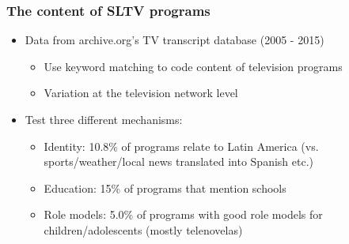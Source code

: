\documentclass{beamer}
\begin{document}
\begin{frame}
\frametitle{The content of SLTV programs}
\begin{itemize}
\item Data from archive.org's TV transcript database (2005 - 2015)
\begin{itemize}
\item Use keyword matching to code content of television programs
\item Variation at the television network level
\end{itemize}
\item Test three different mechanisms:
\begin{itemize}
\item Identity: 10.8\% of programs relate to Latin America (vs. sports/weather/local news translated into Spanish etc.)
\item Education: 15\% of programs that mention schools
\item Role models: 5.0\% of programs with good role models for children/adolescents (mostly telenovelas)
\end{itemize}
\end{itemize}
\end{frame}
\end{document}
